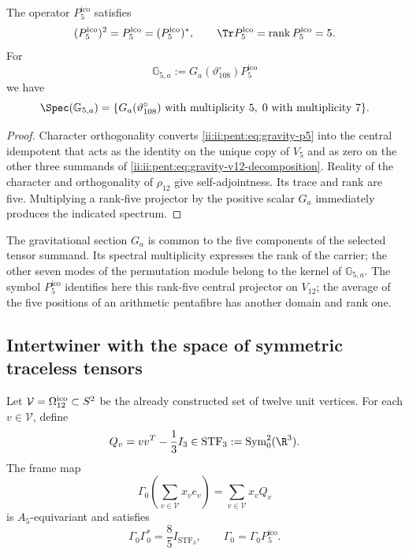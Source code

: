 \begin{theorem}
\label{ii:ii:pent:thm:gravity-p5-coupling}
The operator \(P^{\mathrm{ico}}_5\) satisfies
\begin{equation}
\label{ii:ii:pent:eq:gravity-p5-properties}
(P^{\mathrm{ico}}_5)^2=P^{\mathrm{ico}}_5=(P^{\mathrm{ico}}_5)^*,
\qquad \Tr P^{\mathrm{ico}}_5=\operatorname{rank} P^{\mathrm{ico}}_5=5.
\end{equation}
For
\begin{equation}
\label{ii:ii:pent:eq:gravity-G5}
\mathbb G_{5,a}:=G_a(\vartheta^\circ_{108})P^{\mathrm{ico}}_5
\end{equation}
we have
\begin{equation}
\label{ii:ii:pent:eq:gravity-G5-spectrum}
\Spec(\mathbb G_{5,a})
=\{G_a(\vartheta^\circ_{108})\text{ with multiplicity }5,
\;0\text{ with multiplicity }7\}.
\end{equation}
\end{theorem}

\begin{proof}
Character orthogonality converts \eqref{ii:ii:pent:eq:gravity-p5} into the
central idempotent that acts as the identity on the unique copy of
\(V_5\) and as zero on the other three summands of
\eqref{ii:ii:pent:eq:gravity-v12-decomposition}. Reality of the character and
orthogonality of \(\rho_{12}\) give self-adjointness. Its trace and rank
are five. Multiplying a rank-five projector by the positive scalar
\(G_a\) immediately produces the indicated spectrum.
\end{proof}

The gravitational section \(G_a\) is common to the five components of the
selected tensor summand. Its spectral multiplicity expresses the
rank of the carrier; the other seven modes of the permutation module
belong to the kernel of \(\mathbb G_{5,a}\). The symbol
\(P^{\mathrm{ico}}_5\) identifies here this rank-five central projector
on \(V_{12}\); the average of the five positions of an
arithmetic pentafibre has another domain and rank one.

\subsection{Intertwiner with the space of symmetric traceless tensors}

Let \(\mathcal V=\Omega_{12}^{\rm ico}\subset S^2\) be the already constructed set of
twelve unit vertices. For each \(v\in\mathcal V\), define
\begin{equation}
\label{ii:ii:pent:eq:gravity-Qv}
Q_v=vv^T-\frac13I_3\in
\operatorname{STF}_3:=\operatorname{Sym}^2_0(\R^3).
\end{equation}
The frame map
\begin{equation}
\label{ii:ii:pent:eq:gravity-Gamma0}
\Gamma_0\!\left(\sum_{v\in\mathcal V}x_ve_v\right)
=\sum_{v\in\mathcal V}x_vQ_v
\end{equation}
is \(A_5\)-equivariant and satisfies
\begin{equation}
\label{ii:ii:pent:eq:gravity-tight-frame}
\Gamma_0\Gamma_0^*=\frac85I_{\operatorname{STF}_3},
\qquad
\Gamma_0=\Gamma_0P^{\mathrm{ico}}_5.
\end{equation}

